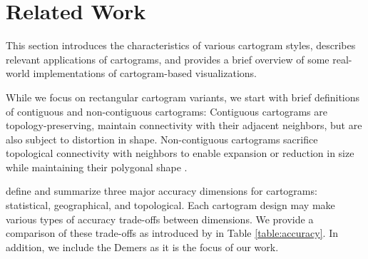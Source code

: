 \section{Related Work}

This section introduces the characteristics of various cartogram styles, describes relevant applications of cartograms, and provides a brief overview of some real-world implementations of cartogram-based visualizations.

While we focus on rectangular cartogram variants, we start with brief definitions of contiguous and non-contiguous cartograms: Contiguous cartograms are topology-preserving, maintain connectivity with their adjacent neighbors, but are also subject to distortion in shape. Non-contiguous cartograms sacrifice topological connectivity with neighbors to enable expansion or reduction in size while maintaining their polygonal shape \cite{dent2009Cartography}.

 define and summarize three major accuracy dimensions for cartograms: statistical, geographical, and topological. Each cartogram design may make various types of accuracy trade-offs between dimensions. We provide a comparison of these trade-offs as introduced by  in Table \ref{table:accuracy}. In addition, we include the Demers as it is the focus of our work.


{
\renewcommand{\arraystretch}{1.5}
\begin{table}[!tb]
	\centering
	\caption{ Trade-off between dimensions.  Dimension sacrificed in order to improve  target dimension's accuracy.}
	\label{table:accuracy}
\end{table}
}


